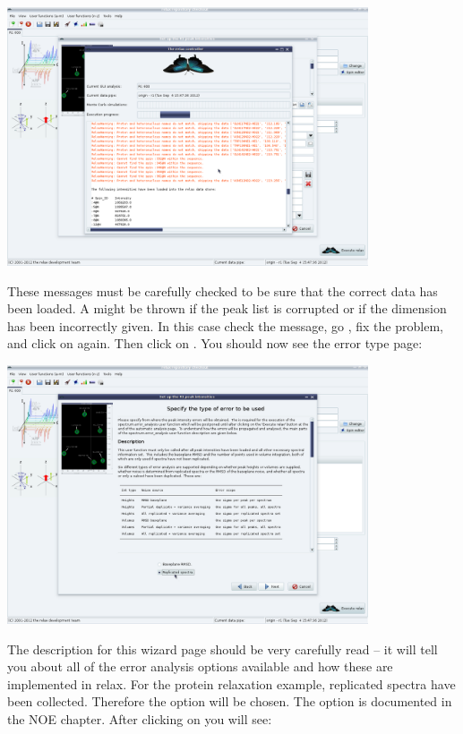 \begin{minipage}[h]{\linewidth}
\centerline{\includegraphics[width=0.8\textwidth, bb=14 14 1415 1019]{graphics/screenshots/r1_analysis/peak_intensity_warnings}}
\end{minipage}

These messages must be carefully checked to be sure that the correct data has been loaded.  A  might be thrown if the peak list is corrupted or if the dimension has been incorrectly given.  In this case check the message, go , fix the problem, and click on  again.
Then click on .
You should now see the error type page:

\begin{minipage}[h]{\linewidth}
\centerline{\includegraphics[width=0.8\textwidth, bb=14 14 1415 1019]{graphics/screenshots/r1_analysis/peak_intensity_err_type}}
\end{minipage}

The description for this wizard page should be very carefully read -- it will tell you about all of the error analysis options available and how these are implemented in relax.  For the protein relaxation example, replicated spectra have been collected.  Therefore the option  will be chosen.  The  option is documented in the NOE chapter.  After clicking on  you will see:


